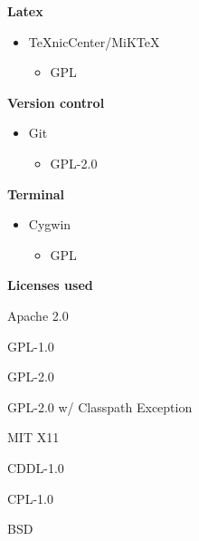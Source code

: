 	\pagebreak

	{\bf Latex}
		\begin{itemize}
			\item TeXnicCenter/MiKTeX\cite{bib:lli}
				\begin{itemize}
					\item GPL
				\end{itemize}
		\end{itemize}
	{\bf Version control}
		\begin{itemize}
			\item Git\cite{bib:gili}
				\begin{itemize}
					\item GPL-2.0
				\end{itemize}
		\end{itemize}
	{\bf Terminal}
		\begin{itemize}
			\item Cygwin\cite{bib:cli}
				\begin{itemize}
					\item GPL
				\end{itemize}
		\end{itemize}

	{\bf Licenses used}
	\begin{description}
		\item[Apache 2.0] \cite{bib:apli}
		\item[GPL-1.0] \cite{bib:gpl1}
		\item[GPL-2.0] \cite{bib:gpl2}
		\item[GPL-2.0 w/ Classpath Exception] \cite{bib:gplw}
		\item[MIT X11]  \cite{bib:mit}
		\item[CDDL-1.0]  \cite{bib:cddl}
		\item[CPL-1.0]  \cite{bib:cpl}
		\item[BSD]  \cite{bib:bsd}
	\end{description}

